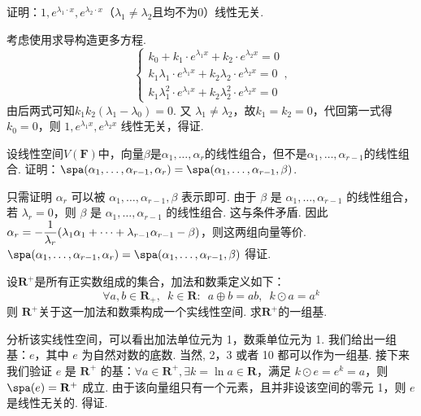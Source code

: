 \begin{exercise}
\begin{exgroup}
        \item 证明：$1,e^{\lambda_1\cdot x},e^{\lambda_2\cdot x}$（$\lambda_1\neq\lambda_2$且均不为0）线性无关.
        \begin{answer}
            考虑使用求导构造更多方程.
            \[\begin{cases}
                    k_0+k_1\cdot e^{\lambda_1 x}+k_2\cdot e^{\lambda_2 x}=0               \\
                    k_1\lambda_1\cdot e^{\lambda_1 x}+k_2\lambda_2\cdot e^{\lambda_2 x}=0 \\
                    k_1\lambda_1^2\cdot e^{\lambda_1 x}+k_2\lambda_2^2\cdot e^{\lambda_2 x}=0
                \end{cases},\]
          由后两式可知$k_1k_2(\lambda_1-\lambda_0)=0$. 又 $\lambda_1\neq\lambda_2$，故$k_1=k_2=0$，代回第一式得 $k_0=0$，则 $1,e^{\lambda_1x},e^{\lambda_2x}$ 线性无关，得证.
        \end{answer}

        \item 设线性空间$V(\mathbf{F})$中，向量$\beta$是$\alpha_1,\ldots,\alpha_r$的线性组合，但不是$\alpha_1,\ldots,\alpha_{r-1}$的线性组合. 证明：$\spa(\alpha_1,\ldots,\alpha_{r-1},\alpha_r)=\spa(\alpha_1,\ldots,\alpha_{r-1},\beta)$.
        \begin{answer}
            只需证明 $\alpha_r$ 可以被 $\alpha_1,\ldots,\alpha_{r-1},\beta$ 表示即可. 由于 $\beta$ 是 $\alpha_1,\ldots,\alpha_{r-1}$ 的线性组合，若 $\lambda_r=0$，则 $\beta$ 是 $\alpha_1,\ldots,\alpha_{r-1}$ 的线性组合. 这与条件矛盾. 因此 $\alpha_r=-\vspace{1ex}\dfrac 1{\lambda_r}(\lambda_1\alpha_1+\cdots+\lambda_{r-1}\alpha_{r-1}-\beta)$，则这两组向量等价. $\spa(\alpha_1,\ldots,\alpha_{r-1},\alpha_r)=\spa(\alpha_1,\ldots,\alpha_{r-1},\beta)$ 得证.
        \end{answer}

        \item \label{item:3:正实数线性空间}
        设$\mathbf{R}^+$是所有正实数组成的集合，加法和数乘定义如下：
        \[ \forall a,b \in \mathbf{R}_+,\enspace k\in \mathbf{R}\colon\enspace a\oplus b = ab,\enspace k\odot a = a^k \]
        则 $\mathbf{R}^+$关于这一加法和数乘构成一个实线性空间. 求$\mathbf{R}^+$的一组基.
        \begin{answer}
            分析该实线性空间，可以看出加法单位元为 1，数乘单位元为 1. 我们给出一组基：$e$，其中 $e$ 为自然对数的底数. 当然, 2，3 或者 10 都可以作为一组基. 接下来我们验证 $e$ 是 $\mathbf{R}^+$ 的基：$\forall a\in \mathbf{R}^+,\exists k=\ln a\in\mathbf{R}$，满足 $k\odot e=e^k=a$，则 $\spa(e)=\mathbf{R}^+$ 成立. 由于该向量组只有一个元素，且并非设该空间的零元 1，则 $e$ 是线性无关的. 得证.
        \end{answer}
    \end{exgroup}


\end{exercise}

